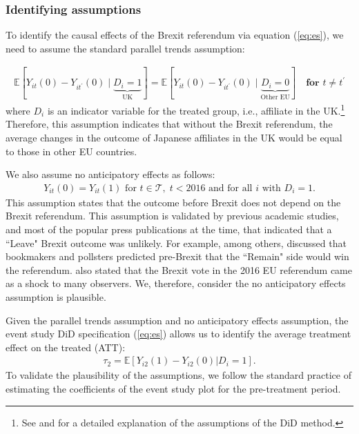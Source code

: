 \documentclass[preprint,11pt,authoryear]{elsarticle}
\begin{document}

\subsubsection{Identifying assumptions}
To identify the causal effects of the Brexit referendum via equation (\ref{eq:es}), we need to assume the standard parallel trends assumption: 

\begin{align}\label{eq:pt}
\mathbb{E}\left[{Y_{i t}(0)}
-{Y_{i t^{\prime}}(0)} \mid \underbrace{D_{i}=1}_{\text{UK}} \right]
=
{\mathbb{E}\left[Y_{i t}(0)-Y_{i t^{\prime}}(0) \mid \underbrace{D_{i}=0}_{\text{Other EU}} \right]} 
\quad \textbf{for } t \neq t^{\prime} 
\end{align}
where $D_{i}$ is an indicator variable for the treated group, i.e., affiliate in the UK.\footnote{
See \cite{callaway2023difference} and \cite{roth2023survey} for a detailed explanation of the assumptions of the DiD method.
} 
Therefore, this assumption indicates that without the Brexit referendum, the average changes in the outcome of Japanese affiliates in the UK would be equal to those in other EU countries.

We also assume no anticipatory effects as follows:
\begin{align}
{Y_{i t}(0)}
=
Y_{i t}(1)  \text{ for } t \in \mathcal{T}, \; t < 2016 \text{ and for all } i \text { with } D_{i}=1.
\end{align}
This assumption states that the outcome before Brexit does not depend on the Brexit referendum. This assumption is validated by previous academic studies, and most of the popular press publications at the time, that indicated that a ``Leave" Brexit outcome was unlikely. For example, among others, \cite{becker_who_2017} discussed that bookmakers and pollsters predicted pre-Brexit that the ``Remain" side would win the referendum. \cite{alabrese_who_2019} also stated that the Brexit vote in the 2016 EU referendum came as a shock to many observers. We, therefore, consider the no anticipatory effects assumption is plausible.


Given the parallel trends assumption and no anticipatory effects assumption, the event study DiD specification (\ref{eq:es}) allows us to identify the average treatment effect on the treated (ATT):
\begin{align}
\tau _{2} = \mathbb{E} [ Y_{i2}(1) - Y_{i2}(0) | D_{i} = 1].
\end{align}
To validate the plausibility of the assumptions, we follow the standard practice of estimating the coefficients of the event study plot for the pre-treatment period.
\end{document}
